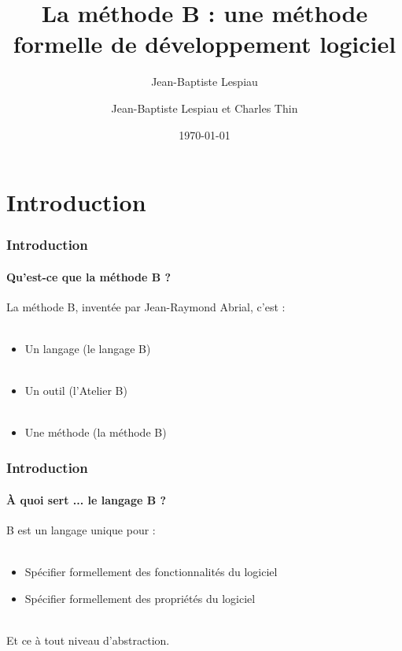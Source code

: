 \documentclass[11pt,a4paper,xcolor=table]{beamer} %
\author[]{Jean-Baptiste Lespiau}
\author{Jean-Baptiste Lespiau et Charles Thin}
\title{La méthode B : une méthode formelle de développement logiciel}
\date\today
\begin{document}
\frame{\titlepage}

\section*{Introduction}

\begin{frame}
\frametitle{Introduction}
\framesubtitle{Qu'est-ce que la méthode B ?}
La méthode B, inventée par Jean-Raymond Abrial, c'est :\\~\\
\begin{itemize}
\pause
\item Un langage (le langage B)\\~\\
\pause
\item Un outil (l'Atelier B)\\~\\
\pause
\item Une méthode (la méthode B)
\end{itemize}
\end{frame}

\begin{frame}
\frametitle{Introduction}
\framesubtitle{À quoi sert ... le langage B ?}
B est un langage unique pour :\\~\\
\pause
\begin{itemize}
\item Spécifier formellement des fonctionnalités du logiciel
\pause
\item Spécifier formellement des propriétés du logiciel
\pause
\end{itemize}
~\\
Et ce à tout niveau d'abstraction.
\end{frame}
\end{document}

